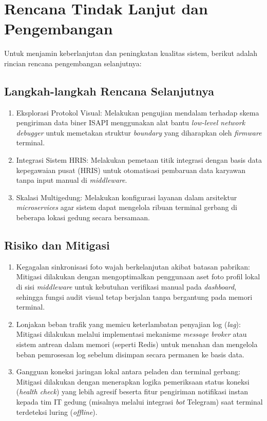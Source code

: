 \section{Rencana Tindak Lanjut dan Pengembangan}
Untuk menjamin keberlanjutan dan peningkatan kualitas sistem, berikut adalah rincian rencana pengembangan selanjutnya:

\subsection{Langkah-langkah Rencana Selanjutnya}
\begin{enumerate}
    \item Eksplorasi Protokol Visual: Melakukan pengujian mendalam terhadap skema pengiriman data biner ISAPI menggunakan alat bantu \textit{low-level network debugger} untuk memetakan struktur \textit{boundary} yang diharapkan oleh \textit{firmware} terminal.
    \item Integrasi Sistem HRIS: Melakukan pemetaan titik integrasi dengan basis data kepegawaian pusat (HRIS) untuk otomatisasi pembaruan data karyawan tanpa input manual di \textit{middleware}.
    \item Skalasi Multigedung: Melakukan konfigurasi layanan dalam arsitektur \textit{microservices} agar sistem dapat mengelola ribuan terminal gerbang di beberapa lokasi gedung secara bersamaan.
\end{enumerate}

\subsection{Risiko dan Mitigasi}
\begin{enumerate}
    \item Kegagalan sinkronisasi foto wajah berkelanjutan akibat batasan pabrikan: Mitigasi dilakukan dengan mengoptimalkan penggunaan aset foto profil lokal di sisi \textit{middleware} untuk kebutuhan verifikasi manual pada \textit{dashboard}, sehingga fungsi audit visual tetap berjalan tanpa bergantung pada memori terminal.
    \item Lonjakan beban trafik yang memicu keterlambatan penyajian log (\textit{lag}): Mitigasi dilakukan melalui implementasi mekanisme \textit{message broker} atau sistem antrean dalam memori (seperti Redis) untuk menahan dan mengelola beban pemrosesan log sebelum disimpan secara permanen ke basis data.
    \item Gangguan koneksi jaringan lokal antara peladen dan terminal gerbang: Mitigasi dilakukan dengan menerapkan logika pemeriksaan status koneksi (\textit{health check}) yang lebih agresif beserta fitur pengiriman notifikasi instan kepada tim IT gedung (misalnya melalui integrasi \textit{bot} Telegram) saat terminal terdeteksi luring (\textit{offline}).
\end{enumerate}

